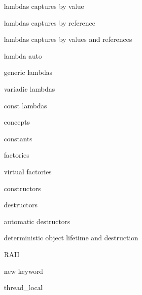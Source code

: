          lambdas captures by value
        
         lambdas captures by reference 
        
         lambdas captures by values and references 
        
         lambda auto
        
         generic lambdas
        
         variadic lambdas 
        
         const lambdas 
        
         concepts 
        
         constants 
        
         factories 
        
         virtual factories 
        
         constructors 
        
         destructors
        
         automatic destructors 
        
         deterministic object lifetime and destruction
        
         RAII 
        
         new keyword 
        
         thread_local
        
